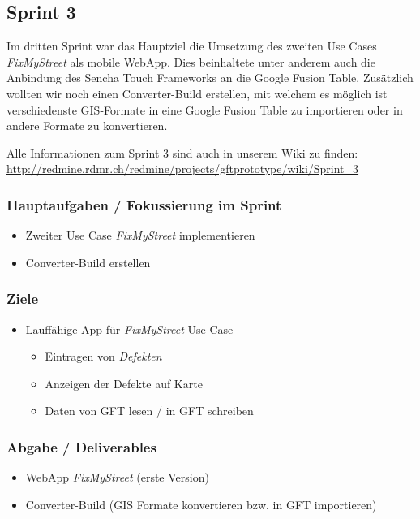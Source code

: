 \subsection{Sprint 3}

Im dritten Sprint war das Hauptziel die Umsetzung des zweiten Use Cases \emph{FixMyStreet} als mobile WebApp. Dies beinhaltete unter anderem auch die Anbindung des Sencha Touch Frameworks an die Google Fusion Table.
Zusätzlich wollten wir noch einen Converter-Build erstellen, mit welchem es möglich ist verschiedenste GIS-Formate in eine Google Fusion Table zu importieren oder in andere Formate zu konvertieren.

Alle Informationen zum Sprint 3 sind auch in unserem Wiki zu finden:
\url{http://redmine.rdmr.ch/redmine/projects/gftprototype/wiki/Sprint_3}

\subsubsection{Hauptaufgaben / Fokussierung im Sprint}
\begin{itemize}
	\item Zweiter Use Case \emph{FixMyStreet} implementieren
	\item Converter-Build erstellen
\end{itemize}

\subsubsection{Ziele}
\begin{itemize}
	\item Lauffähige App für \emph{FixMyStreet} Use Case
	\begin{itemize}
		\item Eintragen von \emph{Defekten}
		\item Anzeigen der Defekte auf Karte
		\item Daten von GFT lesen / in GFT schreiben
	\end{itemize}
\end{itemize}

\subsubsection{Abgabe / Deliverables}
\begin{itemize}
	\item WebApp \emph{FixMyStreet} (erste Version)
	\item Converter-Build (GIS Formate konvertieren bzw. in GFT importieren)
\end{itemize}

